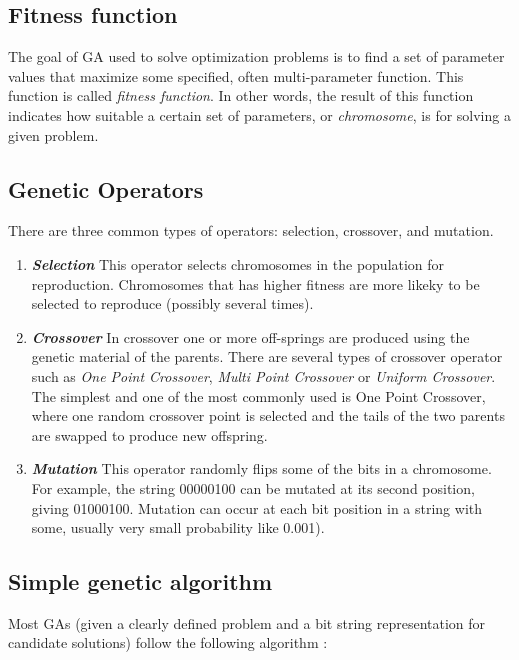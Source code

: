 \subsection{Fitness function}
The goal of GA used to solve optimization problems is to find a set of parameter values that maximize some specified, often multi-parameter function. This function is called \emph{fitness function}. In other words, the result of this function indicates how suitable a certain set of parameters, or \emph{chromosome}, is for solving a given problem. 

\subsection{Genetic Operators}
There are three common types of operators: selection, crossover, and mutation.
\begin{enumerate}
    \item \emph{\textbf{Selection}} This operator selects chromosomes in the population for reproduction. Chromosomes that has higher fitness are more likeky to be selected to reproduce (possibly several times).
    \item \emph{\textbf{Crossover}} In crossover one or more off-springs are produced using the genetic material of the parents. There are several types of crossover operator such as \emph{One Point Crossover}, \emph{Multi Point Crossover} or \emph{Uniform Crossover}. The simplest and one of the most commonly used is One Point Crossover, where one random crossover point is selected and the tails of the two parents are swapped to produce new offspring.
    \item \emph{\textbf{Mutation}} This operator randomly flips some of the bits in a chromosome. For example, the string 00000100 can be mutated at its second position, giving 01000100. Mutation can occur at each bit position in a string with some, usually very small probability like 0.001).
\end{enumerate}

\subsection{Simple genetic algorithm}
Most GAs (given a clearly defined problem and a bit string representation for candidate solutions) follow the following algorithm \cite{mitchell_1998}:

